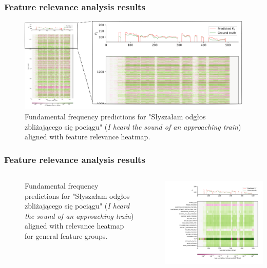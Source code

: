 \documentclass[a4paper,9pt]{beamer}
\theoremstyle{mytheoremstyle}
\begin{document}
\begin{frame}
\frametitle{Feature relevance analysis results}
\begin{figure}
\begin{center}
  \includegraphics[width=\textwidth]{res/amu_pl_ilo_baza_2006a_zbitki_a0036_zoom}
\end{center}
	\caption{Fundamental frequency predictions for "S\l{}ysza\l{}am odg\l{}os zbli\.zaj\k{a}cego si\k{e} poci\k{a}gu" (\textit{I heard the sound of an approaching train}) aligned with feature relevance heatmap.}
\end{figure}
\end{frame}

\begin{frame}
\frametitle{Feature relevance analysis results}
\begin{columns}
\begin{figure}
	\caption{Fundamental frequency predictions for "S\l{}ysza\l{}am odg\l{}os zbli\.zaj\k{a}cego si\k{e} poci\k{a}gu" (\textit{I heard the sound of an approaching train}) aligned with relevance heatmap for general feature groups.}
\end{figure}
\begin{center}
  \includegraphics[width=\textwidth]{res/general_feature_categories_amu_pl_ilo_baza_2006a_zbitki_a0036}
\end{center}
\end{columns}
\end{frame}
\end{document}
